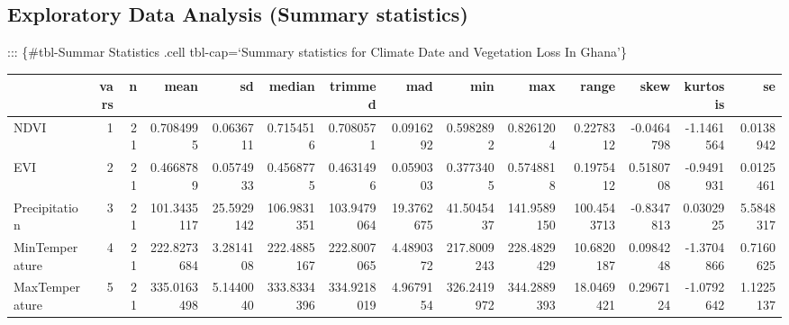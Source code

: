 \documentclass[12pt,a4paper]{book}
\begin{document}
{\hypertarget{exploratory-data-analysis-summary-statistics}{%
\subsection{Exploratory Data Analysis (Summary
statistics)}\label{exploratory-data-analysis-summary-statistics}}

::: \{\#tbl-Summar Statistics .cell tbl-cap=`Summary statistics for
Climate Date and Vegetation Loss In Ghana'\}

\begin{Shaded}
\begin{Highlighting}[]
\OtherTok{\textless{}{-}} \SpecialCharTok{\%\textgreater{}\%}\NormalTok{(}\SpecialCharTok{{-}}
\SpecialCharTok{\%\textgreater{}\%}
  \NormalTok{(} \NormalTok{)}
\end{Highlighting}
\end{Shaded}

\begin{longtable}{lrrrrrrrrrrrrr}
\toprule
  & vars & n & mean & sd & median & trimmed & mad & min & max & range & skew & kurtosis & se\\
\midrule
NDVI & 1 & 21 & 0.7084995 & 0.0636711 & 0.7154516 & 0.7080571 & 0.0916292 & 0.5982892 & 0.8261204 & 0.2278312 & -0.0464798 & -1.1461564 & 0.0138942\\
EVI & 2 & 21 & 0.4668789 & 0.0574933 & 0.4568775 & 0.4631496 & 0.0590303 & 0.3773405 & 0.5748818 & 0.1975412 & 0.5180708 & -0.9491931 & 0.0125461\\
Precipitation & 3 & 21 & 101.3435117 & 25.5929142 & 106.9831351 & 103.9479064 & 19.3762675 & 41.5045437 & 141.9589150 & 100.4543713 & -0.8347813 & 0.0302925 & 5.5848317\\
MinTemperature & 4 & 21 & 222.8273684 & 3.2814108 & 222.4885167 & 222.8007065 & 4.4890372 & 217.8009243 & 228.4829429 & 10.6820187 & 0.0984248 & -1.3704866 & 0.7160625\\
MaxTemperature & 5 & 21 & 335.0163498 & 5.1440040 & 333.8334396 & 334.9218019 & 4.9679154 & 326.2419972 & 344.2889393 & 18.0469421 & 0.2967124 & -1.0792642 & 1.1225137\\
\bottomrule
\end{longtable}

}
\end{document}
